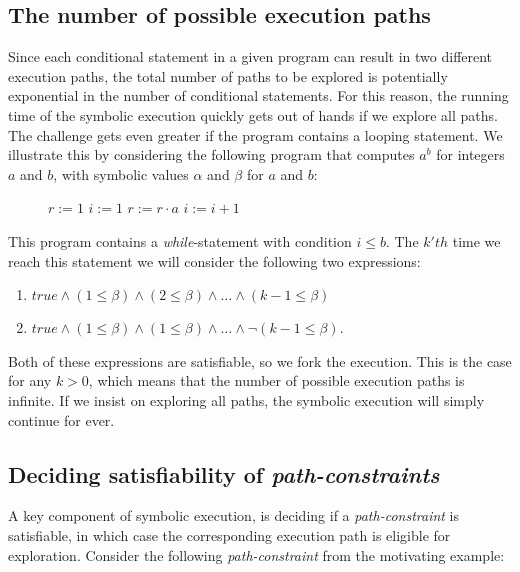 	\subsection{The number of possible execution paths} 
		Since each conditional statement in a given program can result in two different execution paths, the total number of paths to be explored is potentially exponential in the number of conditional statements. 
		For this reason, the running time of the symbolic execution quickly gets out of hands if we explore all paths. 
		 The challenge gets even greater if the program contains a looping statement. We illustrate this by considering the following program that computes $a^b$ for integers $a$ and $b$, with symbolic values $\alpha$ and $\beta$ for $a$ and $b$:
		\begin{figure}[!h]
			\begin{algorithmic}
				\State $r := 1$
				\State $i := 1$
					\State $ r := r\cdot a$
					\State $ i := i + 1$
				\EndWhile
				\State {}
				\EndProcedure
			\end{algorithmic}
		\end{figure}
		\pow{}
		
	This program contains a \textsl{while}-statement with condition $i \leq b$. The $k'th$ time we reach this statement we will consider the following two expressions:
	\begin{enumerate}
		\item $true \land (1 \leq \beta) \land (2 \leq \beta) \land \ldots \land (k-1 \leq \beta) $
		\item $true \land (1 \leq \beta) \land (1 \leq \beta) \land \ldots \land \neg (k-1 \leq \beta) $.
	\end{enumerate}
	Both of these expressions are satisfiable, so we fork the execution. This is the case for any $k > 0$, which means that the number of possible execution paths is infinite. If we insist on exploring all paths, the symbolic execution will simply continue for ever. 
	
	\subsection{Deciding satisfiability of \emph{path-constraints}}
	A key component of symbolic execution, is deciding if a \emph{path-constraint} is satisfiable, in which case the corresponding execution path is eligible for exploration. Consider the following \emph{path-constraint} from the motivating example:
	
